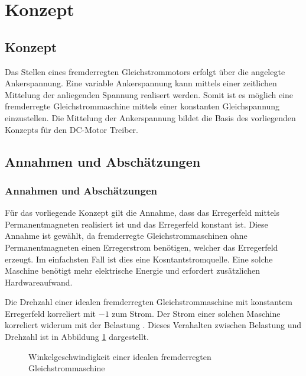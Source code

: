 \ifSTANDALONE
\section{Konzept}
\fi
\ifEMBED
\subsection{Konzept}
\fi

Das Stellen eines fremderregten Gleichstrommotors erfolgt über die
angelegte Ankerspannung. Eine variable Ankerspannung kann mittels einer 
zeitlichen Mittelung der anliegenden Spannung realisert werden. Somit
ist es möglich eine fremderregte Gleichstrommaschine mittels einer
konstanten Gleichspannung einzustellen. Die Mittelung der Ankerspannung
bildet die Basis des vorliegenden Konzepts für den DC-Motor Treiber.

\ifSTANDALONE
\subsection{Annahmen und Abschätzungen}\label{sec:annahmen}
\fi
\ifEMBED
\subsubsection{Annahmen und Abschätzungen}\label{sec:annahmen}
\fi
Für das vorliegende Konzept gilt die Annahme, dass das Erregerfeld mittels
Permanentmagneten realisiert ist und das Erregerfeld konstant ist. Diese
Annahme ist gewählt, da fremderregte Gleichstrommaschinen ohne
Permanentmagneten einen Erregerstrom benötigen, welcher das Erregerfeld
erzeugt. Im einfachsten Fall ist dies eine Kosntantstromquelle. Eine solche
Maschine benötigt mehr elektrische Energie und erfordert zusätzlichen
Hardwareaufwand.

Die Drehzahl einer idealen fremderregten Gleichstrommaschine mit konstantem
Erregerfeld korreliert mit $-1$ zum Strom. Der Strom einer solchen Maschine
korreliert widerum mit der Belastung \cite[p.163]{smps}. Dieses Verahalten
zwischen Belastung und Drehzahl ist in Abbildung \ref{fig:ideal-dc-curve}
dargestellt.

\begin{figure}[h!]
	\centering
	\caption{Winkelgeschwindigkeit einer idealen fremderregten 
		Gleichstrommaschine}
	\label{fig:ideal-dc-curve}
\end{figure}

